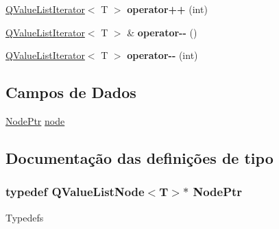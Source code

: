 \begin{DoxyCompactItemize}
\item 
\hypertarget{class_q_value_list_iterator_ac4a7b364b82e48ce66e6ba8feb010546}{\hyperlink{class_q_value_list_iterator}{Q\-Value\-List\-Iterator}$<$ T $>$ {\bfseries operator++} (int)}\label{class_q_value_list_iterator_ac4a7b364b82e48ce66e6ba8feb010546}

\item 
\hypertarget{class_q_value_list_iterator_a57bffebf84df4483486f5590edf4bf7e}{\hyperlink{class_q_value_list_iterator}{Q\-Value\-List\-Iterator}$<$ T $>$ \& {\bfseries operator-\/-\/} ()}\label{class_q_value_list_iterator_a57bffebf84df4483486f5590edf4bf7e}

\item 
\hypertarget{class_q_value_list_iterator_ad711223d6b098c3b92aa82fc9879da6e}{\hyperlink{class_q_value_list_iterator}{Q\-Value\-List\-Iterator}$<$ T $>$ {\bfseries operator-\/-\/} (int)}\label{class_q_value_list_iterator_ad711223d6b098c3b92aa82fc9879da6e}

\end{DoxyCompactItemize}
\subsection*{Campos de Dados}
\begin{DoxyCompactItemize}
\item 
\hyperlink{class_q_value_list_iterator_a33149bd41c7bb5c96791c9455305e769}{Node\-Ptr} \hyperlink{class_q_value_list_iterator_af543614539e0077318342ca740f88513}{node}
\end{DoxyCompactItemize}


\subsection{Documentação das definições de tipo}
\hypertarget{class_q_value_list_iterator_a33149bd41c7bb5c96791c9455305e769}{
\subsubsection[{Node\-Ptr}]{\setlength{\rightskip}{0pt plus 5cm}typedef {\bf Q\-Value\-List\-Node}$<$T$>$$\ast$ {\bf Node\-Ptr}}}\label{class_q_value_list_iterator_a33149bd41c7bb5c96791c9455305e769}
Typedefs 

